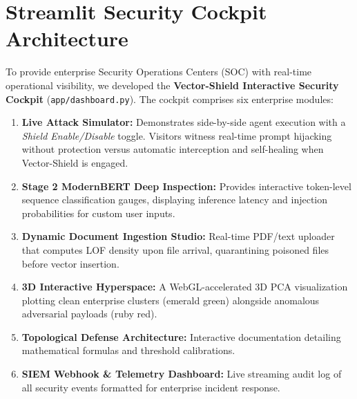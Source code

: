 \section{Streamlit Security Cockpit Architecture}
To provide enterprise Security Operations Centers (SOC) with real-time operational visibility, we developed the \textbf{Vector-Shield Interactive Security Cockpit} (\texttt{app/dashboard.py}). The cockpit comprises six enterprise modules:
\begin{enumerate}
    \item \textbf{Live Attack Simulator:} Demonstrates side-by-side agent execution with a \textit{Shield Enable/Disable} toggle. Visitors witness real-time prompt hijacking without protection versus automatic interception and self-healing when Vector-Shield is engaged.
    \item \textbf{Stage 2 ModernBERT Deep Inspection:} Provides interactive token-level sequence classification gauges, displaying inference latency and injection probabilities for custom user inputs.
    \item \textbf{Dynamic Document Ingestion Studio:} Real-time PDF/text uploader that computes LOF density upon file arrival, quarantining poisoned files before vector insertion.
    \item \textbf{3D Interactive Hyperspace:} A WebGL-accelerated 3D PCA visualization plotting clean enterprise clusters (emerald green) alongside anomalous adversarial payloads (ruby red).
    \item \textbf{Topological Defense Architecture:} Interactive documentation detailing mathematical formulas and threshold calibrations.
    \item \textbf{SIEM Webhook \& Telemetry Dashboard:} Live streaming audit log of all security events formatted for enterprise incident response.
\end{enumerate}
